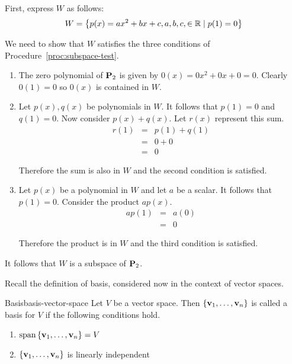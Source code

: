 \begin{solution}
  First, express $W$ as follows:
  \begin{equation*}
    W = \left\{p(x) = ax^2 +bx +c, a,b,c, \in \mathbb{R} \mid p(1)  = 0 \right\}
  \end{equation*}

  We need to show that $W$ satisfies the three conditions of
  Procedure~\ref{proc:subspace-test}.
  \begin{enumerate}
  \item The zero polynomial of $\mathbf{P}_2$ is given by
    $0(x) = 0x^2 + 0x + 0 = 0$. Clearly $0(1) = 0$ so $0(x)$ is
    contained in $W$.

  \item Let $p(x), q(x)$ be polynomials in $W$.  It follows that
    $p(1) = 0 $ and $q(1) = 0$. Now consider $p(x) + q(x)$. Let $r(x)$
    represent this sum.
    \begin{eqnarray*}
      r(1) &=& p(1) + q(1) \\
           &=& 0 + 0 \\
           &=& 0
    \end{eqnarray*}

    Therefore the sum is also in $W$ and the second condition is satisfied.

  \item Let $p(x)$ be a polynomial in $W$ and let $a$ be a scalar. It
    follows that $p(1) = 0$. Consider the product $ap(x)$.
    \begin{eqnarray*}
      ap(1) &=& a(0) \\
            &=& 0
    \end{eqnarray*}

    Therefore the product is in $W$ and the third condition is
    satisfied.
  \end{enumerate}

  It follows that $W$ is a subspace of $\mathbf{P}_2$.
\end{solution}

Recall the definition of basis, considered now in the context of vector spaces.

\begin{definition}{Basis}{basis-vector-space}
  Let $V$ be a vector space. Then
  $\left\{\mbox{\bf v}_{1},\ldots,\mbox{\bf v}_{n}\right\}$ is called a
  basis for $V$ if the following conditions hold.
  \begin{enumerate}
  \item
    $\sspan\set{\vect{v}_{1},\ldots,\vect{v}_{n}} = V$
  \item
    $\left\{\mbox{\bf v}_{1},\ldots,\mbox{\bf v}_{n}\right\}$ is linearly independent
  \end{enumerate}
\end{definition}

